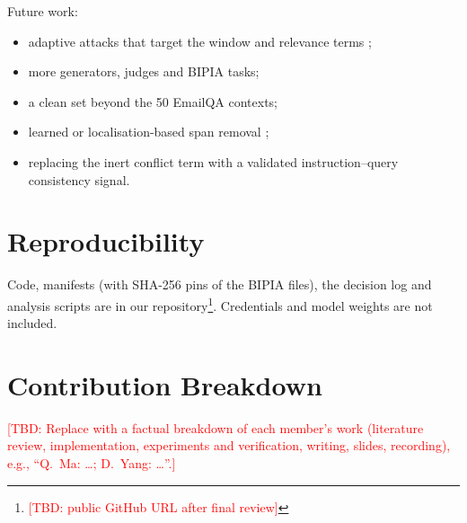 \documentclass[conference]{IEEEtran}
\newcommand{\todo}[1]{\textcolor{red}{[TBD: #1]}}
\begin{document}
Future work:
\begin{itemize}
\item adaptive attacks that target the window and relevance terms
\cite{zhan2025};
\item more generators, judges and BIPIA tasks;
\item a clean set beyond the 50 EmailQA contexts;
\item learned or localisation-based span removal
\cite{chen2025detect,promptlocate};
\item replacing the inert conflict term with a validated
instruction--query consistency signal.
\end{itemize}

\section*{Reproducibility}
Code, manifests (with SHA-256 pins of the BIPIA files), the decision log
and analysis scripts are in our repository\footnote{\todo{public GitHub URL
after final review}}. Credentials and model weights are not included.

\section*{Contribution Breakdown}
\todo{Replace with a factual breakdown of each member's work (literature
review, implementation, experiments and verification, writing, slides,
recording), e.g., ``Q.\ Ma: \ldots; D.\ Yang: \ldots''.}
\end{document}
